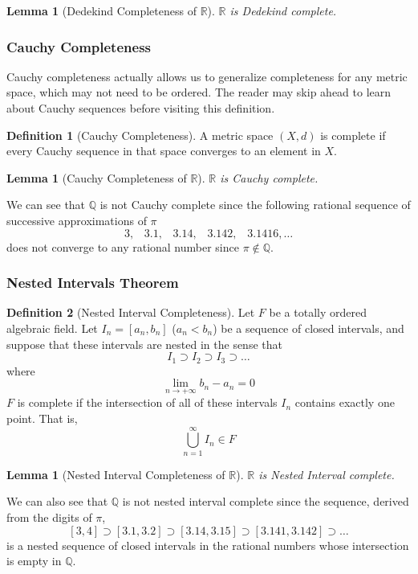\documentclass{article}
\newtheorem{lemma}[theorem]{Lemma}
\theoremstyle{remark}
\theoremstyle{definition}
\newtheorem{definition}{Definition}[section]
\begin{document}
\begin{lemma}[Dedekind Completeness of $\mathbb{R}$]
$\mathbb{R}$ is Dedekind complete. 
\end{lemma}

\subsubsection{Cauchy Completeness}
Cauchy completeness actually allows us to generalize completeness for any metric space, which may not need to be ordered. The reader may skip ahead to learn about Cauchy sequences before visiting this definition. 

\begin{definition}[Cauchy Completeness]
A metric space $(X, d)$ is complete if every Cauchy sequence in that space converges to an element in $X$. 
\end{definition}

\begin{lemma}[Cauchy Completeness of $\mathbb{R}$]
$\mathbb{R}$ is Cauchy complete. 
\end{lemma}

We can see that $\mathbb{Q}$ is not Cauchy complete since the following rational sequence of successive approximations of $\pi$
\[3, \;\;\;3.1, \;\;\;3.14, \;\;\;3.142, \;\;\;3.1416, \ldots\]
does not converge to any rational number since $\pi \not\in \mathbb{Q}$. 

\subsubsection{Nested Intervals Theorem}

\begin{definition}[Nested Interval Completeness]
Let $F$ be a totally ordered algebraic field. Let $I_n= [a_n, b_n]$ ($a_n < b_n$) be a sequence of closed intervals, and suppose that these intervals are nested in the sense that
\[I_1 \supset I_2 \supset I_3 \supset \ldots\]
where 
\[\lim_{n \rightarrow + \infty} b_n - a_n = 0\]
$F$ is complete if the intersection of all of these intervals $I_n$ contains exactly one point. That is, 
\[\bigcup_{n=1}^\infty I_n \in F\]
\end{definition}

\begin{lemma}[Nested Interval Completeness of $\mathbb{R}$]
$\mathbb{R}$ is Nested Interval complete. 
\end{lemma}

We can also see that $\mathbb{Q}$ is not nested interval complete since the sequence, derived from the digits of $\pi$, 
\[[3,4] \supset [3.1, 3.2] \supset [3.14, 3.15] \supset [3.141, 3.142] \supset \ldots\]
is a nested sequence of closed intervals in the rational numbers whose intersection is empty in $\mathbb{Q}$. 
\end{document}
